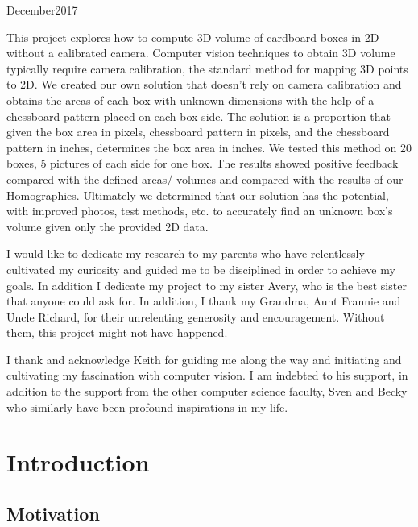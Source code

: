 \documentclass[11pt, twoside, reqno]{book}
\begin{document}
    {December}{2017}

\abstr


This project explores how to compute 3D volume of cardboard boxes in 2D without a calibrated camera. Computer vision techniques to obtain 3D volume typically require camera calibration, the standard method for mapping 3D points to 2D.
We created our own solution that doesn't rely on camera calibration and obtains the areas of each box with unknown dimensions with the help of a chessboard pattern placed on each box side. The solution is a proportion that given the box area in pixels, chessboard pattern in pixels, and the chessboard pattern in inches, determines the box area in inches. We tested this method on 20 boxes, 5 pictures of each side for one box. The results showed positive feedback compared with the defined areas/ volumes and compared with the results of our Homographies. Ultimately we determined that our solution has the potential, with improved photos, test methods, etc. to accurately find an unknown box's volume given only the provided 2D data.

\tableofcontents

\dedic

I would like to dedicate my research to my parents who have relentlessly cultivated my curiosity and guided me to be disciplined in order to achieve my goals. In addition I dedicate my project to my sister Avery, who is the best sister that anyone could ask for. In addition, I thank my Grandma, Aunt Frannie and Uncle Richard, for their unrelenting generosity and encouragement. Without them, this project might not have happened. 

\acknowl

I thank and acknowledge Keith for guiding me along the way and initiating and cultivating my fascination with computer vision. I am indebted to his support, in addition to the support from the other computer science faculty, Sven and Becky who similarly have been profound inspirations in my life. 

\startmain


\chapter{Introduction}
\label{label}

\section{Motivation}
\label{label}
\end{document}
